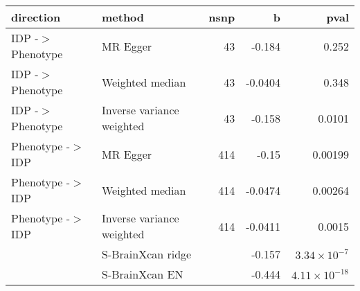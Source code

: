 \begin{table}[ht]
\centering
\begin{tabular}{llrrr}
  \toprule
{\textbf{direction}} & {\textbf{method}} & {\textbf{nsnp}} & {\textbf{b}} & {\textbf{pval}} \\ 
  \midrule
IDP -$>$ Phenotype & MR Egger &   43 & -0.184 & 0.252 \\ 
  IDP -$>$ Phenotype & Weighted median &   43 & -0.0404 & 0.348 \\ 
  IDP -$>$ Phenotype & Inverse variance weighted &   43 & -0.158 & 0.0101 \\ 
  Phenotype -$>$ IDP & MR Egger &  414 & -0.15 & 0.00199 \\ 
  Phenotype -$>$ IDP & Weighted median &  414 & -0.0474 & 0.00264 \\ 
  Phenotype -$>$ IDP & Inverse variance weighted &  414 & -0.0411 & 0.0015 \\ 
   & S-BrainXcan ridge &  & -0.157 & $3.34 \times 10^{-7}$ \\ 
   & S-BrainXcan EN &  & -0.444 & $4.11 \times 10^{-18}$ \\ 
   \bottomrule
\end{tabular}
\end{table}
